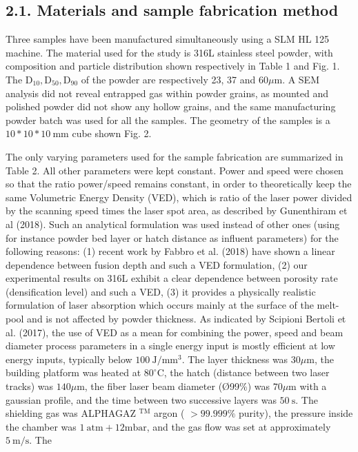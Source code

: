 \documentclass[10pt]{article}
\begin{document}
\subsection*{2.1. Materials and sample fabrication method}
Three samples have been manufactured simultaneously using a SLM HL 125 machine. The material used for the study is 316L stainless steel powder, with composition and particle distribution shown respectively in Table 1 and Fig. 1. The $\mathrm{D}_{10}, \mathrm{D}_{50}, \mathrm{D}_{90}$ of the powder are respectively 23, 37 and $60 \mu \mathrm{m}$. A SEM analysis did not reveal entrapped gas within powder grains, as mounted and polished powder did not show any hollow grains, and the same manufacturing powder batch was used for all the samples. The geometry of the samples is a $10 * 10 * 10 \mathrm{~mm}$ cube shown Fig. 2.

The only varying parameters used for the sample fabrication are summarized in Table 2. All other parameters were kept constant. Power and speed were chosen so that the ratio power/speed remains constant, in order to theoretically keep the same Volumetric Energy Density (VED), which is ratio of the laser power divided by the scanning speed times the laser spot area, as described by Gunenthiram et al (2018). Such an analytical formulation was used instead of other ones (using for instance powder bed layer or hatch distance as influent parameters) for the following reasons: (1) recent work by Fabbro et al. (2018) have shown a linear dependence between fusion depth and such a VED formulation, (2) our experimental results on 316L exhibit a clear dependence between porosity rate (densification level) and such a VED, (3) it provides a physically realistic formulation of laser absorption which occurs mainly at the surface of the melt-pool and is not affected by powder thickness. As indicated by Scipioni Bertoli et al. (2017), the use of VED as a mean for combining the power, speed and beam diameter process parameters in a single energy input is mostly efficient at low energy inputs, typically below $100 \mathrm{~J} / \mathrm{mm}^{3}$. The layer thickness was $30 \mu \mathrm{m}$, the building platform was heated at $80^{\circ} \mathrm{C}$, the hatch (distance between two laser tracks) was $140 \mu \mathrm{m}$, the fiber laser beam diameter (Ø99\%) was $70 \mu \mathrm{m}$ with a gaussian profile, and the time between two successive layers was $50 \mathrm{~s}$. The shielding gas was ALPHAGAZ ${ }^{\mathrm{TM}}$ argon ( $>99.999 \%$ purity), the pressure inside the chamber was $1 \mathrm{~atm}+12 \mathrm{mbar}$, and the gas flow was set at approximately $5 \mathrm{~m} / \mathrm{s}$. The
\end{document}
